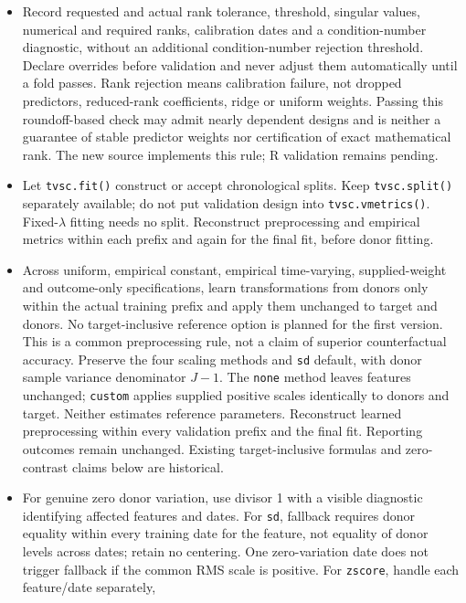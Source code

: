 \documentclass[11pt]{article}
\begin{document}
\begin{itemize}
design fails. Centering handles the agreed intercepts, not another
standardization; do not change matching blocks or silently rescale columns.
\item Record requested and actual rank tolerance, threshold, singular
values, numerical and required ranks, calibration dates and a
condition-number diagnostic, without an additional condition-number
rejection threshold. Declare overrides before validation and never adjust
them automatically until a fold passes. Rank rejection means calibration
failure, not dropped predictors, reduced-rank coefficients, ridge or
uniform weights. Passing this roundoff-based check may admit nearly
dependent designs and is neither a guarantee of stable predictor weights
nor certification of exact mathematical rank. The new source implements
this rule; R validation remains pending.
\item Let \texttt{tvsc.fit()} construct or accept chronological splits.
Keep \texttt{tvsc.split()} separately available; do not put validation
design into \texttt{tvsc.vmetrics()}. Fixed-$\lambda$ fitting needs no
split. Reconstruct preprocessing and empirical metrics within each prefix
and again for the final fit, before donor fitting.
\item Across uniform, empirical constant, empirical time-varying,
supplied-weight and outcome-only specifications, learn transformations
from donors only within the actual training prefix and apply them
unchanged to target and donors. No target-inclusive reference option is
planned for the first version. This is a common preprocessing rule, not
a claim of superior counterfactual accuracy. Preserve the
four scaling methods and \texttt{sd} default, with donor sample variance
denominator $J-1$. The \texttt{none} method leaves features unchanged;
\texttt{custom} applies supplied positive scales identically to donors
and target. Neither estimates reference parameters. Reconstruct learned
preprocessing within every validation prefix and the final fit.
Reporting outcomes remain unchanged. Existing
target-inclusive formulas and zero-contrast claims below are historical.
\item For genuine zero donor variation, use divisor 1 with a visible
diagnostic identifying affected features and dates. For \texttt{sd},
fallback requires donor equality within every training date for the
feature, not equality of donor levels across dates; retain no centering.
One zero-variation date does not trigger fallback if the common RMS scale
is positive. For \texttt{zscore}, handle each feature/date separately,

\end{itemize}
\end{document}
